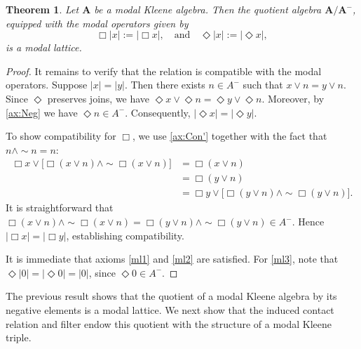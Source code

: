 \documentclass[10pt,a4paper]{amsart}
\newtheorem{theorem}{Theorem}[section]
\newcommand{\A}{\mathbf{A}}
\begin{document}
\begin{theorem}
    Let $\A$ be a modal Kleene algebra. Then the quotient algebra $\mathbf{A/A^{-}}$, equipped with the modal operators given by
    \[
    \Box |x| := |\Box x|, \quad \text{and} \quad \Diamond |x| := |\Diamond x|,
    \]
    is a modal lattice.
\end{theorem}
\begin{proof}
It remains to verify that the relation is compatible with the modal operators. 
Suppose $|x| = |y|$. Then there exists $n \in A^{-}$ such that $x \vee n = y \vee n$. 
Since $\Diamond$ preserves joins, we have $\Diamond x \vee \Diamond n = \Diamond y \vee \Diamond n$. Moreover, by \eqref{ax:Neg} we have $\Diamond n \in A^{-}$. Consequently, $|\Diamond x| = |\Diamond y|$.

To show compatibility for $\Box$, we use \eqref{ax:Con'} together with the fact that $n \wedge \sim n = n$:
    \begin{align*}
        \Box x \vee \bigl[\Box(x\vee n)\wedge \sim \Box(x\vee n)\bigr] &= \Box (x\vee n)\\
        &= \Box (y\vee n)\\
        &= \Box y \vee \bigl[\Box(y \vee n)\wedge \sim \Box(y\vee n)\bigr].
    \end{align*}
    It is straightforward that $\Box(x\vee n)\wedge \sim \Box(x\vee n)=\Box(y\vee n)\wedge \sim \Box(y\vee n)\in A^-$. Hence $|\Box x| = |\Box y|$, establishing compatibility.

It is immediate that axioms \eqref{ml1} and \eqref{ml2} are satisfied. For \eqref{ml3}, note that $\Diamond |0| = |\Diamond 0| = |0|$, since $\Diamond 0 \in A^{-}$.
\end{proof}

The previous result shows that the quotient of a modal Kleene algebra by its negative elements is a modal lattice. We next show that the induced contact relation and filter endow this quotient with the structure of a modal Kleene triple.
\end{document}
